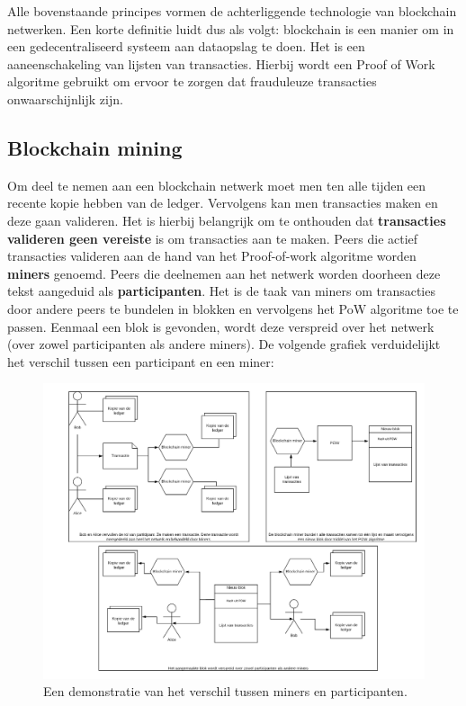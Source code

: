 Alle bovenstaande principes vormen de achterliggende technologie van blockchain netwerken. Een korte definitie luidt dus als volgt: blockchain is een manier om in een gedecentraliseerd systeem aan dataopslag te doen. Het is een aaneenschakeling van lijsten van transacties. Hierbij wordt een Proof of Work algoritme gebruikt om ervoor te zorgen dat frauduleuze transacties onwaarschijnlijk zijn.

\subsection{Blockchain mining}
Om deel te nemen aan een blockchain netwerk moet men ten alle tijden een recente kopie hebben van de ledger. Vervolgens kan men transacties maken en deze gaan valideren. Het is hierbij belangrijk om te onthouden dat \textbf{transacties valideren geen vereiste} is om transacties aan te maken. Peers die actief transacties valideren aan de hand van het Proof-of-work algoritme worden \textbf{miners} genoemd. Peers die deelnemen aan het netwerk worden doorheen deze tekst aangeduid als \textbf{participanten}. Het is de taak van miners om transacties door andere peers te bundelen in blokken en vervolgens het PoW algoritme toe te passen. Eenmaal een blok is gevonden, wordt deze verspreid over het netwerk (over zowel participanten als andere miners). De volgende grafiek verduidelijkt het verschil tussen een participant en een miner:

\begin{figure}[h!]
	\centering
		\includegraphics[scale=0.2]{blockchain-5.png}
	\caption[Blockchain - Voorstelling 5]{Een demonstratie van het verschil tussen miners en participanten.}
\end{figure}
\newpage

